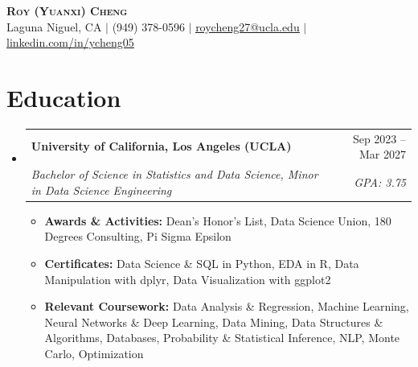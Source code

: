 \documentclass[letterpaper,11pt]{article}
\makeatletter
\newcommand{\resumeItem}[1]{
  \item\small{#1}
}
\newcommand{\resumeSubheading}[4]{
  \vspace{-2pt}\item
    \begin{tabular*}{\textwidth}[t]{l@{\extracolsep{\fill}}r}
      \textbf{#1} & #2 \\
      \textit{\small#3} & \textit{\small #4} \\
    \end{tabular*}\vspace{-7pt}
}
\newcommand{\resumeSubHeadingListStart}{\begin{itemize}[leftmargin=0in, label={}]}
\newcommand{\resumeSubHeadingListEnd}{\end{itemize}}
\newcommand{\resumeItemListStart}{\begin{itemize}[itemsep= 1.5pt, parsep=0pt]}
\newcommand{\resumeItemListEnd}{\end{itemize}\vspace{-5pt}}
\makeatother
\begin{document}
\begin{center}
    \textbf{\LARGE \scshape Roy (Yuanxi) Cheng} \\ \vspace{3pt}
    \small Laguna Niguel, CA $|$ (949) 378-0596 $|$
    \href{mailto:roycheng27@ucla.edu}{\underline{roycheng27@ucla.edu}} $|$
    \href{https://www.linkedin.com/in/ycheng05}{\underline{linkedin.com/in/ycheng05}}
\end{center}
\section{Education}
  \resumeSubHeadingListStart
    \resumeSubheading
      {University of California, Los Angeles (UCLA)}{Sep 2023 -- Mar 2027}
      {Bachelor of Science in Statistics and Data Science, Minor in Data Science Engineering}{GPA: 3.75}
      \resumeItemListStart
        \resumeItem{\textbf{Awards \& Activities:} Dean's Honor's List, Data Science Union, 180 Degrees Consulting, Pi Sigma Epsilon}
        \resumeItem{\textbf{Certificates:} Data Science \& SQL in Python, EDA in R, Data Manipulation with dplyr, Data Visualization with ggplot2}
        \resumeItem{\textbf{Relevant Coursework:} Data Analysis \& Regression, Machine Learning, Neural Networks \& Deep Learning, Data Mining, Data Structures \& Algorithms, Databases, Probability \& Statistical Inference, NLP, Monte Carlo, Optimization}
      \resumeItemListEnd
  \resumeSubHeadingListEnd
\end{document}
